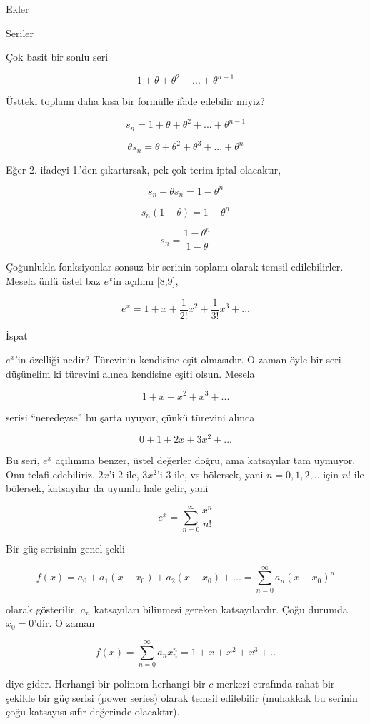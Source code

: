 \documentclass[12pt,fleqn]{article}\usepackage{../../common}
\begin{document}
Ekler

Seriler

Çok basit bir sonlu seri

$$ 1 + \theta + \theta^2 + ... + \theta^{n-1} $$

Üstteki toplamı daha kısa bir formülle ifade edebilir miyiz? 

$$ s_n = 1 + \theta + \theta^2 + ... + \theta^{n-1} $$

$$ \theta s_n = \theta + \theta^2 + \theta^3 + ... + \theta^n $$

Eğer 2. ifadeyi 1.'den çıkartırsak, pek çok terim iptal olacaktır,

$$ s_n - \theta s_n = 1 - \theta^n $$

$$ s_n ( 1 - \theta) = 1 - \theta^n $$

$$ s_n = \frac{1 - \theta^n}{1 - \theta} $$

Çoğunlukla fonksiyonlar sonsuz bir serinin toplamı olarak temsil
edilebilirler. Mesela ünlü üstel baz $e^x$in açılımı [8,9],

$$ e^x = 1 + x + \frac{1}{2!}x^2 + \frac{1}{3!}x^3 + ... $$

İspat

$e^x$'in özelliği nedir? Türevinin kendisine eşit olmasıdır. O zaman öyle
bir seri düşünelim ki türevini alınca kendisine eşiti olsun. Mesela

$$ 1 + x + x^2 + x^3 + ... $$

serisi ``neredeyse'' bu şarta uyuyor, çünkü türevini alınca 

$$ 0 + 1 + 2x + 3x^2 + ... $$

Bu seri, $e^x$ açılımına benzer, üstel değerler doğru, ama katsayılar
tam uymuyor. Onu telafi edebiliriz. $2x$'i $2$ ile, $3x^2$'i $3$ ile, vs
bölersek, yani $n=0,1,2,..$ için $n!$ ile bölersek, katsayılar da uyumlu
hale gelir, yani 

$$ e^x = \sum _{ n=0}^{\infty} \frac{ x^n}{n!} $$

Bir güç serisinin genel şekli

$$ f(x) = a_0 + a_1(x-x_0) + a_2(x-x_0) + ... = \sum _{ n=0}^{\infty} a_n (x-x_0)^n$$

olarak gösterilir, $a_n$ katsayıları bilinmesi gereken katsayılardır. Çoğu
durumda $x_0=0$'dir. O zaman 

$$ f(x) = \sum _{ n=0}^{\infty} a_n x_n^n = 1+x+x^2+x^3+..$$

diye gider. Herhangi bir polinom herhangi bir $c$ merkezi etrafında rahat
bir şekilde bir güç serisi (power series) olarak temsil edilebilir
(muhakkak bu serinin çoğu katsayısı sıfır değerinde olacaktır). 
\end{document}
